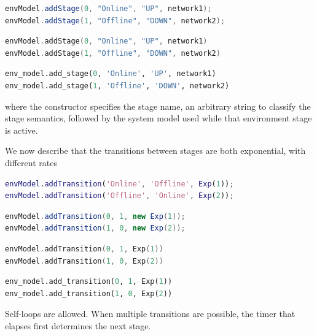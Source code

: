 \begin{JAVA}
\begin{lstlisting}[language = java, basicstyle=\ttfamily\scriptsize]
envModel.addStage(0, "Online", "UP", network1);
envModel.addStage(1, "Offline", "DOWN", network2);
\end{lstlisting}
\end{JAVA}
\begin{KOTLIN}
\begin{lstlisting}[language = kotlin, basicstyle=\ttfamily\scriptsize]
envModel.addStage(0, "Online", "UP", network1)
envModel.addStage(1, "Offline", "DOWN", network2)
\end{lstlisting}
\end{KOTLIN}
\begin{PYTHON}
\begin{lstlisting}[language=python]
env_model.add_stage(0, 'Online', 'UP', network1)
env_model.add_stage(1, 'Offline', 'DOWN', network2)
\end{lstlisting}
\end{PYTHON}
where the constructor specifies the stage name, an arbitrary string to classify the stage semantics, followed by the system model used while that environment stage is active.

We now describe that the transitions between stages are both exponential, with different rates
\begin{MATLAB}
\begin{lstlisting}[language = matlab]
envModel.addTransition('Online', 'Offline', Exp(1));
envModel.addTransition('Offline', 'Online', Exp(2));
\end{lstlisting}
\end{MATLAB}
\begin{JAVA}
\begin{lstlisting}[language = java, basicstyle=\ttfamily\scriptsize]
envModel.addTransition(0, 1, new Exp(1));
envModel.addTransition(1, 0, new Exp(2));
\end{lstlisting}
\end{JAVA}
\begin{KOTLIN}
\begin{lstlisting}[language = kotlin, basicstyle=\ttfamily\scriptsize]
envModel.addTransition(0, 1, Exp(1))
envModel.addTransition(1, 0, Exp(2))
\end{lstlisting}
\end{KOTLIN}
\begin{PYTHON}
\begin{lstlisting}[language=python]
env_model.add_transition(0, 1, Exp(1))
env_model.add_transition(1, 0, Exp(2))
\end{lstlisting}
\end{PYTHON}
Self-loops are allowed. When multiple transitions are possible, the timer that elapses first determines the next stage.

